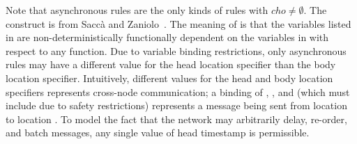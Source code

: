 \begin{comment}
\subsection{Causality rewrite}

As written, asynchronous rules can allow messages to travel back in time.  Intuitively, we strive to allow only those models that are causally plausible: a message sent by a node at local timestamp $s$ cannot cause a message to arrive in the past of node $x$ (i.e., before local timestamp $s$).

\begin{Drules}
\drule{notZero(T)}
      {succ(T,S)}
\drule{zero(T)}
      {time(T), \lnot notZero(T)}
\end{Drules}

\begin{Drules}
\drule{rcvClock(X,S,Y,S)}
      {node(X), node(Y), X \neq Y, zero(S)}
\drule{rcvClock(X,S,X,S')}
      {node(X), timeSucc(S,S')}
\drule{rcvClock(X,S',Y,T)}
      {clock(X,S,Y,T), X \neq Y, timeSucc(S,S')}
\end{Drules}

\footnote{We can get \neq from < by disjunction.}

Given the following asynchronous rule, without any causality enforced:

...

We rewrite it as the following batch of rules:

...
\end{comment}

Note that asynchronous rules are the only kinds of rules with $cho \neq \emptyset$.
The  construct is from Sacc\`{a} and Zaniolo~\cite{sacca-zaniolo}.
The meaning of  is that the variables listed
in  are non-deterministically functionally dependent on the variables in  with respect to
any function.  Due to variable binding restrictions, only asynchronous rules may
have a different value for the head location specifier than the body location
specifier.  Intuitively, different values for the head and body location specifiers represents
cross-node communication; a binding of , , and 
(which must include  due to safety restrictions) represents a message
being sent from location  to location .  To model the fact
that the network may arbitrarily delay, re-order, and batch messages, any single
value of head timestamp  is permissible.

